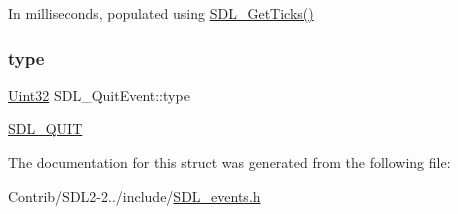 In milliseconds, populated using \mbox{\hyperlink{_s_d_l__timer_8h_a0b9bc71d6287e0ffafdc3419760fe2b3}{S\+D\+L\+\_\+\+Get\+Ticks()}} \mbox{\label{struct_s_d_l___quit_event_a51ab0279e6de40249ba93971a8757cf0}} 
\subsubsection{\texorpdfstring{type}{type}}
{\footnotesize\ttfamily \mbox{\hyperlink{_s_d_l__stdinc_8h_add440eff171ea5f55cb00c4a9ab8672d}{Uint32}} S\+D\+L\+\_\+\+Quit\+Event\+::type}

\mbox{\hyperlink{_s_d_l__events_8h_a3b589e89be6b35c02e0dd34a55f3fccaa31acc5fdafc86ebe2c1f5c3cae48d603}{S\+D\+L\+\_\+\+Q\+U\+IT}} 

The documentation for this struct was generated from the following file\+:\begin{DoxyCompactItemize}
\item 
Contrib/\+S\+D\+L2-\/2../include/\mbox{\hyperlink{_s_d_l__events_8h}{S\+D\+L\+\_\+events.\+h}}\end{DoxyCompactItemize}
